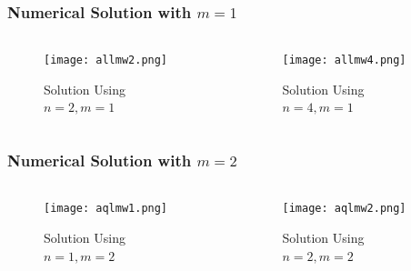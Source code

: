     \begin{frame}\frametitle{Numerical Solution with $m=1$}
    
      \begin{columns}[T]
        \begin{column}{.5\textwidth}
      
              \begin{figure}
              \centering
              \texttt{[image: allmw2.png]}
              \caption{Solution Using \\ $n=2,m=1$}
              \label{fig_e_vs_n_f1}
              \end{figure}

        \end{column}
      \begin{column}{.5\textwidth}

              \begin{figure}
              \centering
              \texttt{[image: allmw4.png]}
              \caption{Solution Using \\ $n=4,m=1$}
              \label{fig_e_vs_n_f2}
              \end{figure}

      \end{column}
    \end{columns}
    \end{frame}

\begin{frame}\frametitle{Numerical Solution with $m = 2$}



    \begin{columns}[T]
      \begin{column}{.5\textwidth}
      
              \begin{figure}
              \centering
              \texttt{[image: aqlmw1.png]}
              \caption{Solution Using \\ $n=1,m=2$}
              \label{fig_e_vs_n_f1}
              \end{figure}

      \end{column}
      \begin{column}{.5\textwidth}
              \begin{figure}
              \centering
              \texttt{[image: aqlmw2.png]}
              \caption{Solution Using \\ $n=2,m=2$}
              \label{fig_e_vs_n_f2}
              \end{figure}

        \end{column}
      \end{columns}
    \end{frame}


